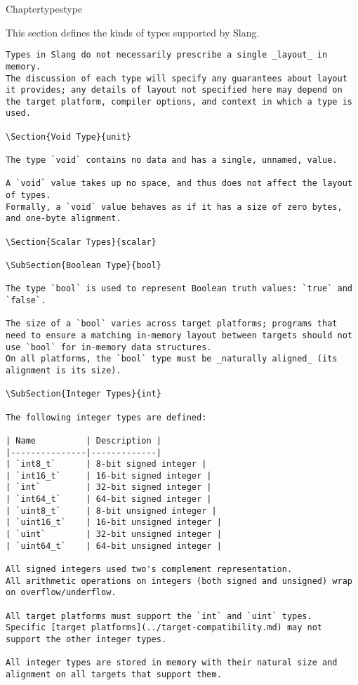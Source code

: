 Chapter{types}{type}

This section defines the kinds of types supported by Slang.

\begin{verbatim}
Types in Slang do not necessarily prescribe a single _layout_ in memory.
The discussion of each type will specify any guarantees about layout it provides; any details of layout not specified here may depend on the target platform, compiler options, and context in which a type is used.

\Section{Void Type}{unit}

The type `void` contains no data and has a single, unnamed, value.

A `void` value takes up no space, and thus does not affect the layout of types.
Formally, a `void` value behaves as if it has a size of zero bytes, and one-byte alignment.

\Section{Scalar Types}{scalar}

\SubSection{Boolean Type}{bool}

The type `bool` is used to represent Boolean truth values: `true` and `false`.

The size of a `bool` varies across target platforms; programs that need to ensure a matching in-memory layout between targets should not use `bool` for in-memory data structures.
On all platforms, the `bool` type must be _naturally aligned_ (its alignment is its size).

\SubSection{Integer Types}{int}

The following integer types are defined:

| Name          | Description |
|---------------|-------------|
| `int8_t`      | 8-bit signed integer |
| `int16_t`     | 16-bit signed integer |
| `int`         | 32-bit signed integer |
| `int64_t`     | 64-bit signed integer |
| `uint8_t`     | 8-bit unsigned integer |
| `uint16_t`    | 16-bit unsigned integer |
| `uint`        | 32-bit unsigned integer |
| `uint64_t`    | 64-bit unsigned integer |

All signed integers used two's complement representation.
All arithmetic operations on integers (both signed and unsigned) wrap on overflow/underflow.

All target platforms must support the `int` and `uint` types.
Specific [target platforms](../target-compatibility.md) may not support the other integer types.

All integer types are stored in memory with their natural size and alignment on all targets that support them.


\end{verbatim}
